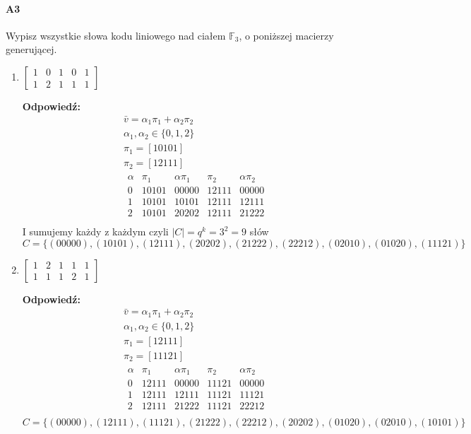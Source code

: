 \documentclass[a4paper,12pt]{article}
\theoremstyle{definition}%
\theoremstyle{definition}
\theoremstyle{problem}
\begin{document}
\paragraph{A3} Wypisz wszystkie słowa kodu liniowego nad ciałem $\mathbb{F}_3$, o poniższej macierzy generującej.
\begin{enumerate}[label=\alph*)]
\item $\begin{bmatrix}
1& 0& 1& 0& 1\\
1& 2& 1& 1& 1
\end{bmatrix}$

\textbf{Odpowiedź:}
\begin{align*}
&\bar{v}=\alpha_1\pi_1+ \alpha _2\pi_2\\
&\alpha _1,\alpha_2\in\{0,1,2\}\\
&\pi_1=[10101]\\
&\pi_2=[12111]\\
&\begin{array}{l|l|l||l|l}
\alpha & \pi_1 & \alpha\pi_1 &\pi _2 &\alpha\pi_2\\\hline
0 & 10101 & 00000 & 12111 & 00000 \\
1 & 10101 & 10101 & 12111 & 12111 \\
2 & 10101 & 20202 & 12111 & 21222 \\
\end{array}
\end{align*}
I sumujemy każdy z każdym czyli $|C|=q^k=3^2=9$ słów
$$C=\{(00000),(10101),(12111),(20202),(21222),(22212),(02010),(01020),(11121)\}$$
\item $\begin{bmatrix}
1& 2& 1& 1& 1\\
1& 1& 1& 2& 1 \end{bmatrix}$

\textbf{Odpowiedź:}
\begin{align*}
&\bar{v}=\alpha_1\pi_1+ \alpha _2\pi_2\\
&\alpha _1,\alpha_2\in\{0,1,2\}\\
&\pi_1=[12111]\\
&\pi_2=[11121]\\
&\begin{array}{l|l|l||l|l}
\alpha & \pi_1 & \alpha\pi_1 &\pi _2 &\alpha\pi_2\\\hline
0 & 12111 & 00000 & 11121 & 00000 \\
1 & 12111 & 12111 & 11121 & 11121 \\
2 & 12111 & 21222 & 11121 & 22212 \\
\end{array}
\end{align*}
$$C=\{(00000),(12111),(11121),(21222),(22212),(20202),(01020),(02010),(10101)\}$$
\end{enumerate}
\end{document}
